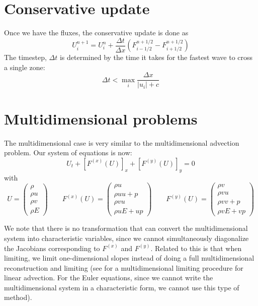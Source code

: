 \section{Conservative update}

Once we have the fluxes, the conservative update is done as
\begin{equation}
U^{n+1}_i = U^n_i + \frac{\Delta t}{\Delta x} \left ( F_{i-1/2}^{n+1/2} - F_{i+1/2}^{n+1/2} \right )
\end{equation}
The timestep, $\Delta t$ is determined by the time it takes for the fastest
wave to cross a single zone:
\begin{equation}
\Delta t < \max_i \frac{\Delta x}{|u_i| + c}
\end{equation}


\section{Multidimensional problems}

The multidimensional case is very similar to the multidimensional
advection problem.  Our system of equations is now:
\begin{equation}
U_t + [F^{(x)}(U)]_x + [F^{(y)}(U)]_y = 0
\end{equation}
with
\begin{equation}
U = \left ( \begin{array}{c} \rho \\ \rho u \\ \rho v \\ \rho E \end{array} \right )
%
\qquad
%
F^{(x)}(U) = \left ( \begin{array}{c} \rho u \\ \rho uu + p \\ \rho v u \\ \rho u E + up \end{array} \right )
%
\qquad
F^{(y)}(U) = \left ( \begin{array}{c} \rho v \\ \rho vu     \\ \rho v v + p \\ \rho v E + vp \end{array} \right )
\end{equation}

We note that there is no transformation that can convert the multidimensional
system into characteristic variables, since we cannot simultaneously
diagonalize the Jacobians corresponding to $F^{(x)}$ and $F^{(y)}$.  Related
to this is that when limiting, we limit one-dimensional slopes instead of
doing a full multidimensional reconstruction and limiting (see \cite{BDS}
for a multidimensional limiting procedure for linear advection.  For
the Euler equations, since we cannot write the multidimensional system
in a characteristic form, we cannot use this type of method).

